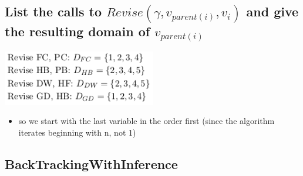 \documentclass[conference]{styles/acmsiggraph}
\begin{document}
\subsection{List the calls to $Revise(\gamma, v_{parent(i)}, v_i)$ and give the resulting domain of $v_{parent(i)}$}

\includegraphics[width=0.5\textwidth]{imgs/revise.png}

\begin{itemize}
    \item so we start with the last variable in the order first (since the algorithm iterates beginning with n, not 1)
\end{itemize}

\subsection{BackTrackingWithInference}

\end{document}
